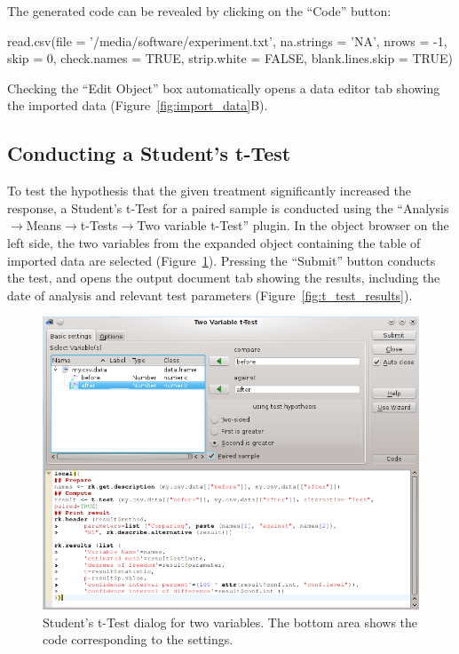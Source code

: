 The generated  code can be revealed by clicking on the ``Code'' button:

\begin{Code}
read.csv(file = '/media/software/experiment.txt',
         na.strings = 'NA', nrows = -1, skip = 0,
         check.names = TRUE, strip.white = FALSE, blank.lines.skip = TRUE)
\end{Code}

Checking the ``Edit Object'' box automatically opens a data editor tab
showing the imported data (Figure~\ref{fig:import_data}B).

\subsection{Conducting a Student's t-Test}
\label{sec:conducting_ttest}
To test the hypothesis that the given treatment significantly increased the response, a Student's
t-Test for a paired sample is conducted using the
``Analysis$\rightarrow$Means$\rightarrow$t-Tests$\rightarrow$Two variable t-Test'' plugin.
In the object browser on the left side, the two variables from the expanded
 object containing the table of imported data 
are selected (Figure~\ref{fig:t_test_dialog}). 
Pressing the ``Submit'' button conducts the test, and opens the output document tab
showing the results, including the date of analysis and relevant test parameters (Figure~\ref{fig:t_test_results}).

\begin{figure}[b!]
 \centering
 \includegraphics[width=13.5cm]{./figures/t-test_dialog.png}
 \caption{Student's t-Test dialog for two variables. The bottom area shows the  code corresponding to the settings.}
 \label{fig:t_test_dialog}
\end{figure}


